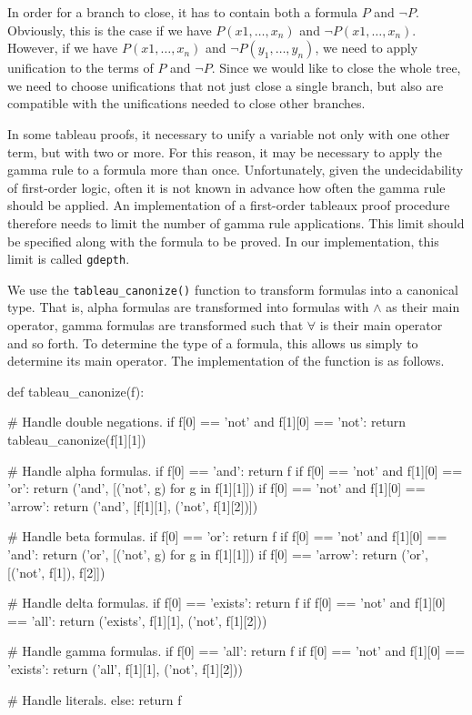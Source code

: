 \documentclass[a4paper,notitlepage]{scrartcl}
\begin{document}
In order for a branch to close, it has to contain both a formula $P$ and $\lnot
P$. Obviously, this is the case if we have $P(x1, \ldots, x_n)$ and $\lnot
P(x1, \ldots, x_n)$. However, if we have $P(x1, \ldots, x_n)$ and $\lnot P(y_1,
\ldots, y_n)$, we need to apply unification to the terms of $P$ and $\lnot P$.
Since we would like to close the whole tree, we need to choose unifications
that not just close a single branch, but also are compatible with the
unifications needed to close other branches.

In some tableau proofs, it necessary to unify a variable not only with one
other term, but with two or more. For this reason, it may be necessary to apply
the gamma rule to a formula more than once. Unfortunately, given the
undecidability of first-order logic, often it is not known in advance how often
the gamma rule should be applied. An implementation of a first-order tableaux
proof procedure therefore needs to limit the number of gamma rule applications.
This limit should be specified along with the formula to be proved. In our
implementation, this limit is called \texttt{gdepth}.

We use the \texttt{tableau\_canonize()} function to transform formulas into a
canonical type. That is, alpha formulas are transformed into formulas with
$\land$ as their main operator, gamma formulas are transformed such that
$\forall$ is their main operator and so forth. To determine the type of a
formula, this allows us simply to determine its main operator. The
implementation of the function is as follows.

\begin{code}
def tableau_canonize(f):

    # Handle double negations.
    if f[0] == 'not' and f[1][0] == 'not':
        return tableau_canonize(f[1][1])

    # Handle alpha formulas.
    if f[0] == 'and':
        return f 
    if f[0] == 'not' and f[1][0] == 'or':
        return ('and', [('not', g) for g in f[1][1]])
    if f[0] == 'not' and f[1][0] == 'arrow':
        return ('and', [f[1][1], ('not', f[1][2])])

    # Handle beta formulas.
    if f[0] == 'or':
        return f 
    if f[0] == 'not' and f[1][0] == 'and':
        return ('or', [('not', g) for g in f[1][1]])
    if f[0] == 'arrow':
        return ('or', [('not', f[1]), f[2]])

    # Handle delta formulas.
    if f[0] == 'exists':
        return f 
    if f[0] == 'not' and f[1][0] == 'all':
        return ('exists', f[1][1], ('not', f[1][2]))

    # Handle gamma formulas.
    if f[0] == 'all':
        return f
    if f[0] == 'not' and f[1][0] == 'exists':
        return ('all', f[1][1], ('not', f[1][2]))

    # Handle literals. 
    else:
        return f 
\end{code}
\end{document}
